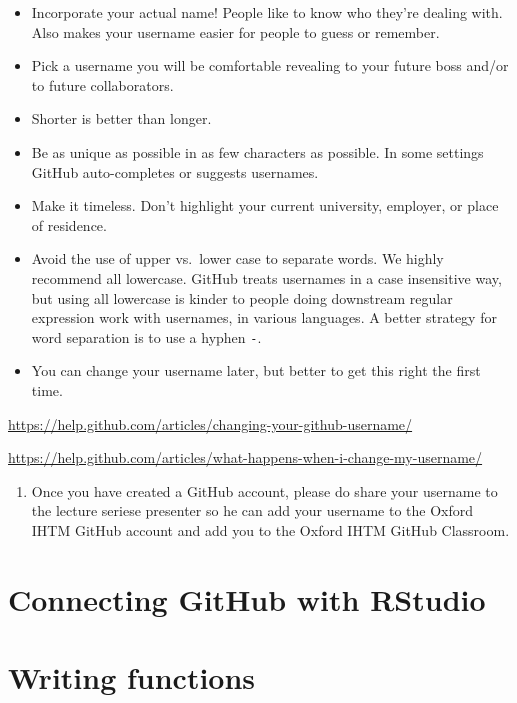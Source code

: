 \documentclass[
  12pt,
]{book}
\providecommand{\tightlist}{%
  \setlength{\itemsep}{0pt}\setlength{\parskip}{0pt}}
\begin{document}
\begin{itemize}
\item
  Incorporate your actual name! People like to know who they're dealing with. Also makes your username easier for people to guess or remember.
\item
  Pick a username you will be comfortable revealing to your future boss and/or to future collaborators.
\item
  Shorter is better than longer.
\item
  Be as unique as possible in as few characters as possible. In some settings GitHub auto-completes or suggests usernames.
\item
  Make it timeless. Don't highlight your current university, employer, or place of residence.
\item
  Avoid the use of upper vs.~lower case to separate words. We highly recommend all lowercase. GitHub treats usernames in a case insensitive way, but using all lowercase is kinder to people doing downstream regular expression work with usernames, in various languages. A better strategy for word separation is to use a hyphen \texttt{-}.
\item
  You can change your username later, but better to get this right the first time.
\end{itemize}

\url{https://help.github.com/articles/changing-your-github-username/}

\url{https://help.github.com/articles/what-happens-when-i-change-my-username/}

\begin{enumerate}
\def\labelenumi{\arabic{enumi}.}
\setcounter{enumi}{5}
\tightlist
\item
  Once you have created a GitHub account, please do share your username to the lecture seriese presenter so he can add your username to the Oxford IHTM GitHub account and add you to the Oxford IHTM GitHub Classroom.
\end{enumerate}

\hypertarget{connect-github-rstudio}{%
\chapter{Connecting GitHub with RStudio}\label{connect-github-rstudio}}

\hypertarget{write-functions}{%
\chapter{Writing functions}\label{write-functions}}
\end{document}
